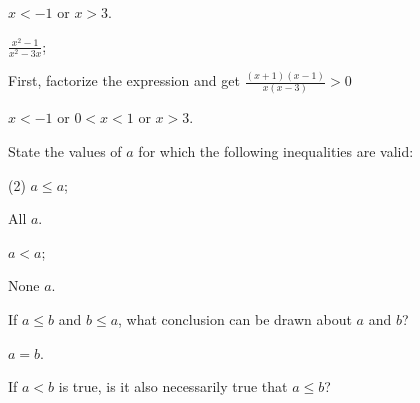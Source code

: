 \begin{questions}
\begin{tasks}
\begin{solution}
      $x<-1$ or $x>3$.
    \end{solution}

    \task \(\frac{x^2-1}{x^2-3x}\);

    \begin{solution}
      First, factorize the expression and get \(\frac{(x+1)(x-1)}{x(x-3)}>0\)


      $x<-1$ or $0<x<1$ or $x>3$.
    \end{solution}

  \end{tasks}
  \item State the values of $a$ for which the following inequalities are valid:
  \begin{tasks}(2)
    \task $a \leq a$;

    \begin{solution}
      All $a$.
    \end{solution}

    \task $a<a$;

    \begin{solution}
      None $a$.
    \end{solution}

  \end{tasks}
  \item If $a \leq b$ and $b \leq a$, what conclusion can be drawn about $a$ and $b$?

  \begin{solution}
    $a=b$.
  \end{solution}

  \item \begin{tasks}
    \task If $a<b$ is true, is it also necessarily true that $a \leq b$?


\end{tasks}
\end{questions}
